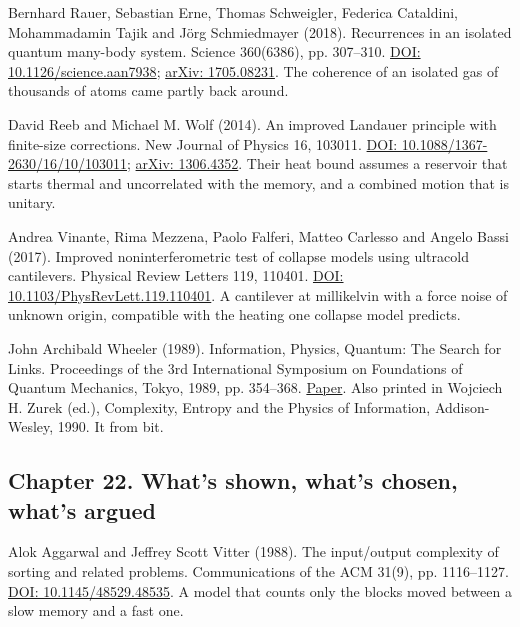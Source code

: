 \noindent Bernhard Rauer, Sebastian Erne, Thomas Schweigler, Federica Cataldini, Mohammadamin Tajik and J\"org Schmiedmayer (2018). Recurrences in an isolated quantum many-body system. Science 360(6386), pp. 307--310. \href{https://doi.org/10.1126/science.aan7938}{DOI: 10.1126/science.aan7938}; \href{https://arxiv.org/abs/1705.08231}{arXiv: 1705.08231}. The coherence of an isolated gas of thousands of atoms came partly back around.
\par\medskip

\noindent David Reeb and Michael M. Wolf (2014). An improved Landauer principle with finite-size corrections. New Journal of Physics 16, 103011. \href{https://doi.org/10.1088/1367-2630/16/10/103011}{DOI: 10.1088/1367-2630/16/10/103011}; \href{https://arxiv.org/abs/1306.4352}{arXiv: 1306.4352}. Their heat bound assumes a reservoir that starts thermal and uncorrelated with the memory, and a combined motion that is unitary.
\par\medskip

\noindent Andrea Vinante, Rima Mezzena, Paolo Falferi, Matteo Carlesso and Angelo Bassi (2017). Improved noninterferometric test of collapse models using ultracold cantilevers. Physical Review Letters 119, 110401. \href{https://doi.org/10.1103/PhysRevLett.119.110401}{DOI: 10.1103/PhysRevLett.119.110401}. A cantilever at millikelvin with a force noise of unknown origin, compatible with the heating one collapse model predicts.
\par\medskip

\noindent John Archibald Wheeler (1989). Information, Physics, Quantum: The Search for Links. Proceedings of the 3rd International Symposium on Foundations of Quantum Mechanics, Tokyo, 1989, pp. 354--368. \href{https://jawarchive.files.wordpress.com/2012/03/informationquantumphysics.pdf}{Paper}. Also printed in Wojciech H. Zurek (ed.), Complexity, Entropy and the Physics of Information, Addison-Wesley, 1990. It from bit.
\par\medskip

\subsection*{Chapter 22. What's shown, what's chosen, what's argued}

\noindent Alok Aggarwal and Jeffrey Scott Vitter (1988). The input/output complexity of sorting and related problems. Communications of the ACM 31(9), pp. 1116--1127. \href{https://doi.org/10.1145/48529.48535}{DOI: 10.1145/48529.48535}. A model that counts only the blocks moved between a slow memory and a fast one.
\par\medskip

